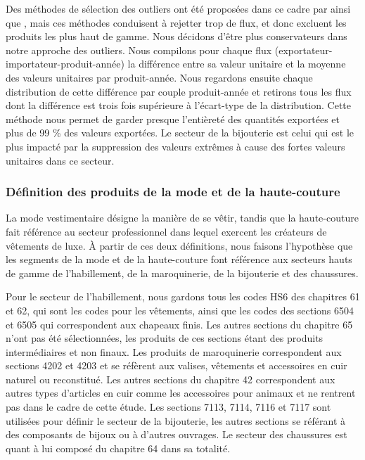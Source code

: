 \documentclass[french,10pt,a4paper]{article}
\begin{document}
Des méthodes de sélection des outliers ont été proposées dans ce cadre par \cite{Hallak2006} ainsi que \cite{Fontagne2013}, mais ces méthodes conduisent à rejetter trop de flux, et donc excluent les produits les plus haut de gamme. Nous décidons d'être plus conservateurs dans notre approche des outliers. Nous compilons pour chaque flux (exportateur-importateur-produit-année) la différence entre sa valeur unitaire et la moyenne des valeurs unitaires par produit-année. Nous regardons ensuite chaque distribution de cette différence par couple produit-année et retirons tous les flux dont la différence est trois fois supérieure à l'écart-type de la distribution. Cette méthode nous permet de garder presque l'entièreté des quantités exportées et plus de 99 \% des valeurs exportées. Le secteur de la bijouterie est celui qui est le plus impacté par la suppression des valeurs extrêmes à cause des fortes valeurs unitaires dans ce secteur.

\subsubsection*{Définition des produits de la mode et de la haute-couture}
La mode vestimentaire désigne la manière de se vêtir, tandis que la haute-couture fait référence au secteur professionnel dans lequel exercent les créateurs de vêtements de luxe. À partir de ces deux définitions, nous faisons l'hypothèse que les segments de la mode et de la haute-couture font référence aux secteurs hauts de gamme de l'habillement, de la maroquinerie, de la bijouterie et des chaussures.

Pour le secteur de l'habillement, nous gardons tous les codes HS6 des chapitres 61 et 62, qui sont les codes pour les vêtements, ainsi que les codes des sections 6504 et 6505 qui correspondent aux chapeaux finis. Les autres sections du chapitre 65 n'ont pas été sélectionnées, les produits de ces sections étant des produits intermédiaires et non finaux. Les produits de maroquinerie correspondent aux sections 4202 et 4203 et se réfèrent aux valises, vêtements et accessoires en cuir naturel ou reconstitué. Les autres sections du chapitre 42 correspondent aux autres types d'articles en cuir comme les accessoires pour animaux et ne rentrent pas dans le cadre de cette étude. Les sections 7113, 7114, 7116 et 7117 sont utilisées pour définir le secteur de la bijouterie, les autres sections se référant à des composants de bijoux ou à d'autres ouvrages. Le secteur des chaussures est quant à lui composé du chapitre 64 dans sa totalité.
\end{document}
